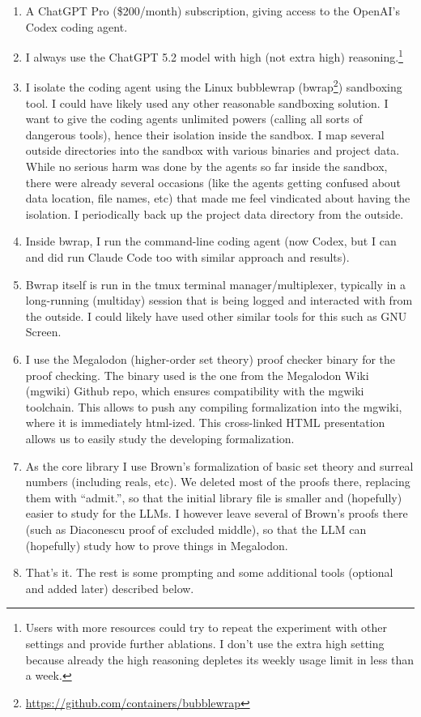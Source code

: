 \documentclass[a4paper,UKenglish,cleveref, autoref, thm-restate]{lipics-v2021}
\begin{document}
\begin{enumerate}
\item A ChatGPT Pro (\$200/month) subscription, giving access to the OpenAI's Codex coding agent.
\item I always use the ChatGPT 5.2 model with high (not extra high) reasoning.\footnote{Users with more resources could try to repeat the experiment with other settings and provide further ablations. I don't use the extra high setting because already the high reasoning depletes its weekly usage limit in less than a week.}
\item I isolate the coding agent using the Linux bubblewrap (bwrap\footnote{\url{https://github.com/containers/bubblewrap}}) sandboxing tool. I could have likely used any other reasonable sandboxing solution. I want to give the coding agents unlimited powers (calling all sorts of dangerous tools), hence their isolation inside the sandbox. I map several outside directories into the sandbox with various binaries and project data. While no serious harm was done by the agents so far inside the sandbox, there were already several occasions (like the agents getting confused about data location, file names, etc) that made me feel vindicated about having the isolation. I periodically back up the project data directory from the outside.
\item Inside bwrap, I run the command-line coding agent (now Codex, but I can and did run Claude Code too with similar approach and results).
\item Bwrap itself is run in the tmux terminal manager/multiplexer, typically in a long-running (multiday) session that is being logged and interacted with from the outside. I could likely have used other similar tools for this such as GNU Screen.
\item I use the Megalodon (higher-order set theory) proof checker binary for the proof checking. The binary used is the one from the Megalodon Wiki (mgwiki) Github repo, which ensures compatibility with the mgwiki toolchain. This allows to push any compiling   formalization into the mgwiki, where it is immediately html-ized. This cross-linked HTML presentation allows us to easily study the developing formalization.
\item As the
    core library I use Brown's formalization of basic set theory and
    surreal numbers (including reals, etc). We deleted most of the proofs there, replacing them with ``admit.'', so that the initial library file is smaller and (hopefully) easier to study for the LLMs. I however leave several of Brown's proofs there (such as Diaconescu proof of excluded middle), so that the LLM can (hopefully) study how to prove things in Megalodon.
  \item That's it. The rest is some prompting and some additional tools (optional and added later) described below.
\end{enumerate}
\end{document}
